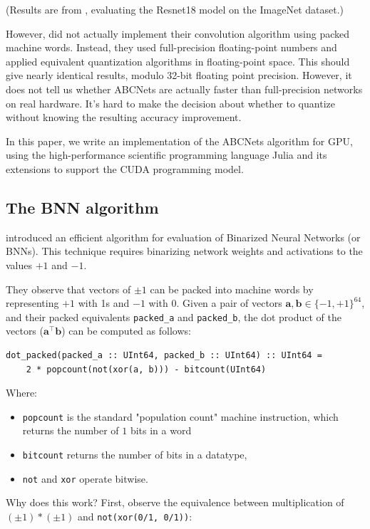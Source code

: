 \documentclass[12pt]{article}
\newcommand{\av}[0]{\mathbf{a}}
\newcommand{\bv}[0]{\mathbf{b}}
\newcommand{\transpose}[1]{#1 ^\top}
\newcommand{\dotp}[2]{\transpose{#1} #2}
\begin{document}
(Results are from \citet{ABCNets}, evaluating the Resnet18 model on the ImageNet dataset.)

However, \citet{ABCNets} did not actually implement their convolution algorithm using packed machine words. Instead, they used full-precision floating-point numbers and applied equivalent quantization algorithms in floating-point space. This should give nearly identical results, modulo 32-bit floating point precision. However, it does not tell us whether ABCNets are actually faster than full-precision networks on real hardware. It's hard to make the decision about whether to quantize without knowing the resulting accuracy improvement.

In this paper, we write an implementation of the ABCNets algorithm for GPU, using the high-performance scientific programming language Julia and its extensions to support the CUDA programming model.

\subsection{The BNN algorithm}
\label{sec:org5cdd643}
\citet{BinarizedNeuralNetworks} introduced an efficient algorithm for evaluation of Binarized Neural Networks (or BNNs). This technique requires binarizing network weights and activations to the values \(+1\) and \(-1\).

They observe that vectors of \(\pm 1\) can be packed into machine words by representing \(+1\) with 1s and \(-1\) with 0.
Given a pair of vectors \(\av, \bv \in \{-1,+1\}^{64}\), and their packed equivalents \texttt{packed\_a} and \texttt{packed\_b}, the dot product of the vectors (\(\dotp{\av}{\bv}\)) can be computed as follows:
\begin{verbatim}
dot_packed(packed_a :: UInt64, packed_b :: UInt64) :: UInt64 =
    2 * popcount(not(xor(a, b))) - bitcount(UInt64)
\end{verbatim}
Where:
\begin{itemize}
\item \texttt{popcount} is the standard "population count" machine instruction, which returns the number of \(1\) bits in a word
\item \texttt{bitcount} returns the number of bits in a datatype,
\item \texttt{not} and \texttt{xor} operate bitwise.
\end{itemize}

Why does this work? First, observe the equivalence between multiplication of \((\pm 1) * (\pm 1)\) and \texttt{not(xor(0/1, 0/1))}:
\end{document}
